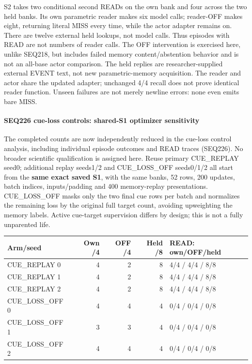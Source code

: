 \documentclass[11pt]{article}
\begin{document}
S2 takes two conditional second READs on the own bank and four across the two
held banks. Its own parametric reader makes six model calls; reader-OFF makes
eight, returning literal MISS every time, while the actor adapter remains on.
There are twelve external held lookups, not model calls. Thus episodes with
READ are not numbers of reader calls. The OFF intervention is exercised here,
unlike SEQ218, but includes failed memory content/abstention behavior and is not
an all-base actor comparison. The held replies are researcher-supplied external
EVENT text, not new parametric-memory acquisition. The reader and actor share
the updated adapter; unchanged 4/4 recall does not prove identical reader function.
Unseen failures are not merely newline errors: none even emits bare MISS.

\paragraph{SEQ226 cue-loss controls: shared-S1 optimizer sensitivity}

The completed counts are now independently reduced in the cue-loss control
analysis, including individual episode outcomes and READ traces (SEQ226).
No broader scientific qualification is assigned here. Reuse primary
CUE\_REPLAY seed0; additional replay seeds1/2 and CUE\_LOSS\_OFF seeds0/1/2 all
start from the \textbf{same exact saved S1}, with the same banks, 52 rows, 200 updates,
batch indices, inputs/padding and 400 memory-replay presentations. CUE\_LOSS\_OFF
masks only the two final cue rows per batch and normalizes the remaining loss
by the original full target count, avoiding upweighting the memory labels.
Active cue-target supervision differs by design; this is not a fully unparented life.

\begin{center}
\small
\begin{tabular}{lrrrl}
\toprule
Arm/seed & Own /4 & OFF /4 & Held /8 & READ: own/OFF/held \\
\midrule
CUE\_REPLAY 0 & 4 & 2 & 8 & 4/4 / 4/4 / 8/8 \\
CUE\_REPLAY 1 & 4 & 2 & 8 & 4/4 / 4/4 / 8/8 \\
CUE\_REPLAY 2 & 4 & 2 & 8 & 4/4 / 4/4 / 8/8 \\
CUE\_LOSS\_OFF 0 & 4 & 4 & 4 & 0/4 / 0/4 / 0/8 \\
CUE\_LOSS\_OFF 1 & 3 & 3 & 4 & 0/4 / 0/4 / 0/8 \\
CUE\_LOSS\_OFF 2 & 4 & 4 & 4 & 0/4 / 0/4 / 0/8 \\
\bottomrule
\end{tabular}
\end{center}
\end{document}
